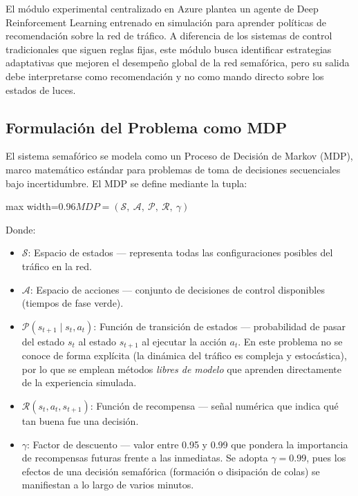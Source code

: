 \documentclass[12pt,a4paper,oneside]{report}
\newenvironment{centeredmath}
  {\begin{center}\begin{adjustbox}{max width=0.96\linewidth}\(\displaystyle}
  {\)\end{adjustbox}\end{center}}
\begin{document}
El módulo experimental centralizado en Azure plantea un agente de Deep Reinforcement Learning entrenado en simulación para aprender políticas de recomendación sobre la red de tráfico. A diferencia de los sistemas de control tradicionales que siguen reglas fijas, este módulo busca identificar estrategias adaptativas que mejoren el desempeño global de la red semafórica, pero su salida debe interpretarse como recomendación y no como mando directo sobre los estados de luces.

\subsection{Formulación del Problema como MDP}\label{formulaciuxf3n-del-problema-como-mdp}

El sistema semafórico se modela como un Proceso de Decisión de Markov (MDP), marco matemático estándar para problemas de toma de decisiones secuenciales bajo incertidumbre. El MDP se define mediante la tupla:

\begin{centeredmath}
MDP = (\mathcal{S},\ \mathcal{A},\ \mathcal{P},\ \mathcal{R},\ \gamma)
\end{centeredmath}

Donde:

\begin{itemize}
\item
  \(\mathcal{S}\): Espacio de estados --- representa todas las configuraciones posibles del tráfico en la red.
\item
  \(\mathcal{A}\): Espacio de acciones --- conjunto de decisiones de control disponibles (tiempos de fase verde).
\item
  \(\mathcal{P}(s_{t+1} \mid s_{t}, a_{t})\): Función de transición de estados --- probabilidad de pasar del estado \(s_{t}\) al estado \(s_{t+1}\) al ejecutar la acción \(a_{t}\). En este problema no se conoce de forma explícita (la dinámica del tráfico es compleja y estocástica), por lo que se emplean métodos \emph{libres de modelo} que aprenden directamente de la experiencia simulada.
\item
  \(\mathcal{R}(s_{t}, a_{t}, s_{t+1})\): Función de recompensa --- señal numérica que indica qué tan buena fue una decisión.
\item
  \(\gamma\): Factor de descuento --- valor entre 0.95 y 0.99 que pondera la importancia de recompensas futuras frente a las inmediatas. Se adopta \(\gamma = 0.99\), pues los efectos de una decisión semafórica (formación o disipación de colas) se manifiestan a lo largo de varios minutos.
\end{itemize}
\end{document}

